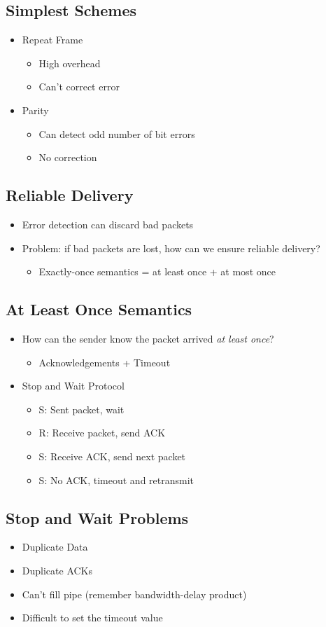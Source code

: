 \subsection{Simplest Schemes}
\begin{itemize}
    \item Repeat Frame
          \begin{itemize}
              \item High overhead
              \item Can't correct error
          \end{itemize}
    \item Parity
          \begin{itemize}
              \item Can detect odd number of bit errors
              \item No correction
          \end{itemize}
\end{itemize}

\subsection{Reliable Delivery}
\begin{itemize}
    \item Error detection can discard bad packets
    \item Problem: if bad packets are lost, how can we ensure reliable delivery?
          \begin{itemize}[nosep]
              \item Exactly-once semantics = at least once + at most once
          \end{itemize}
\end{itemize}
\subsection{At Least Once Semantics}
\begin{itemize}[nosep]
    \item How can the sender know the packet arrived \emph{at least once}?
          \begin{itemize}[nosep]
              \item Acknowledgements + Timeout
          \end{itemize}
    \item Stop and Wait Protocol
          \begin{itemize}[nosep]
              \item S: Sent packet, wait
              \item R: Receive packet, send ACK
              \item S: Receive ACK, send next packet
              \item S: No ACK, timeout and retransmit
          \end{itemize}
\end{itemize}

\subsection{Stop and Wait Problems}
\begin{itemize}[nosep]
    \item Duplicate Data
    \item Duplicate ACKs
    \item Can't fill pipe (remember bandwidth-delay product)
    \item Difficult to set the timeout value
\end{itemize}